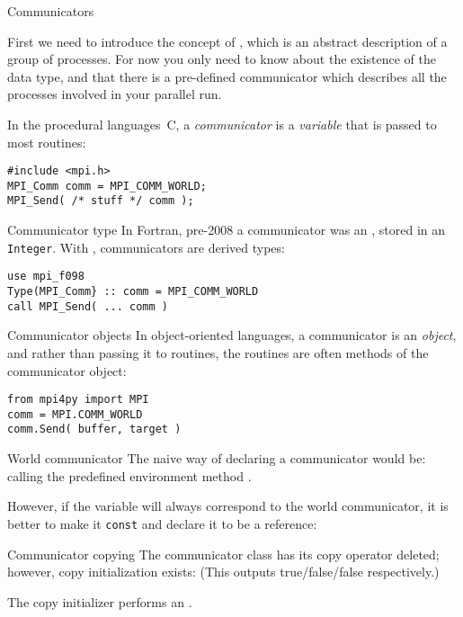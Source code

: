  {Communicators}

First we need to introduce the concept of
, which is an abstract description of a
group of processes. For now you only need to know about the existence
of the  data type, and that there is a
pre-defined communicator  which
describes all the processes involved in your parallel run.


In the procedural languages~C,
a \emph{communicator} is a \emph{variable}
that is passed to most routines:
\begin{lstlisting}
#include <mpi.h>
MPI_Comm comm = MPI_COMM_WORLD;
MPI_Send( /* stuff */ comm );
\end{lstlisting}

\begin{fortrannote}{Communicator type}
  In Fortran, pre-2008 a communicator was an ,
  stored in an \lstinline{Integer}. With ,
  communicators are derived types:
\begin{lstlisting}
use mpi_f098
Type(MPI_Comm} :: comm = MPI_COMM_WORLD
call MPI_Send( ... comm )
\end{lstlisting}
\end{fortrannote}

\begin{pythonnote}{Communicator objects}
In object-oriented languages, a communicator is an
\emph{object},
and rather than passing it to routines,
the routines are often methods of the communicator object:
\begin{lstlisting}
from mpi4py import MPI
comm = MPI.COMM_WORLD
comm.Send( buffer, target )
\end{lstlisting}
\end{pythonnote}

\begin{mplnote}{World communicator}
  The naive way of declaring a communicator would be:
  calling the predefined environment method .

  However, if the variable will always correspond to the world communicator,
  it is better to make it \lstinline{const} and declare it to be a reference:
\end{mplnote}

\begin{mplnote}{Communicator copying}
  The communicator class has its copy operator deleted;
  however, copy initialization exists:
  (This outputs true/false/false respectively.)

  \begin{mplimpl}
    The copy initializer performs an .
  \end{mplimpl}
\end{mplnote}

